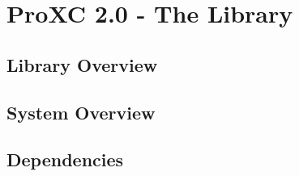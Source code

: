 
\chapter{ProXC 2.0 - The Library}
\label{ch:proxc_library}

\section{Library Overview}

\section{System Overview}


\section{Dependencies}
